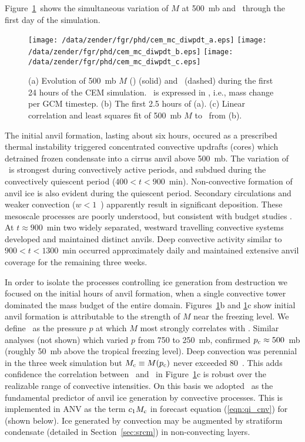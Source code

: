 \documentclass[twoside,agums]{aguplus}
\begin{document}
Figure~\ref{fig:cem_mc_diwpdt}\ shows the simultaneous variation of
$M$ at 500~mb and \IWPdot\ through the first day of the simulation.  
\begin{figure}
\begin{center}
\texttt{[image: /data/zender/fgr/phd/cem\_mc\_diwpdt\_a.eps]}\vfill
\texttt{[image: /data/zender/fgr/phd/cem\_mc\_diwpdt\_b.eps]}\vfill
\texttt{[image: /data/zender/fgr/phd/cem\_mc\_diwpdt\_c.eps]}\vfill
\end{center}
\caption[Evolution and correlation of 500~mb $M$ and \IWPdot\ during 
the first 24 hours of the CEM simulation]{
(a) Evolution of 500~mb $M$ (\gxmS) (solid) and \IWPdot\ (dashed)
during the first 24 hours of the CEM simulation. 
\IWPdot\ is expressed in \gxmSgcmt, i.e., mass change per GCM
timestep. 
(b) The first 2.5 hours of (a).
(c) Linear correlation and least squares fit of 500~mb $M$ to \IWPdot\
from (b).\label{fig:cem_mc_diwpdt}}
\end{figure}
The initial anvil formation, lasting about six hours, occured as a
prescribed thermal instability triggered concentrated convective
updrafts (cores) which detrained frozen condensate into a cirrus anvil
above 500~mb.
The variation of \IWPdot\ is strongest during convectively
active periods, and subdued during the convectively quiescent period
($400 < t < 900$~min). 
Non-convective formation of anvil ice is also evident during the
quiescent period. 
Secondary circulations and weaker convection ($w < 1$~\mxs) apparently 
result in significant deposition.
These mesoscale processes are poorly understood, but consistent with
budget studies \cite[]{LeH80}.
At $t \approx 900$~min two widely separated, westward travelling
convective systems developed and maintained distinct anvils.
Deep convective activity similar to $900 < t < 1300$~min occurred
approximately daily and maintained extensive anvil coverage for the
remaining three weeks.

In order to isolate the processes controlling ice generation
from destruction we focused on the initial hours of anvil formation,
when a single convective tower dominated the mass budget of the entire
domain. 
Figures~\ref{fig:cem_mc_diwpdt}b and \ref{fig:cem_mc_diwpdt}c show
initial anvil formation is attributable to the strength of $M$ near
the freezing level. 
We define \pc\ as the pressure $p$ at which $M$ most strongly
correlates with \IWPdot. 
Similar analyses (not shown) which varied $p$ from 750 to 250~mb,
confirmed $\mbox{$p_\mathrm{c}$} \approx 500$~mb (roughly 50~mb above the tropical
freezing level).
Deep convection was perennial in the three week simulation but 
$\mbox{$M_\mathrm{c}$} \equiv M(\mbox{$p_\mathrm{c}$})$ never exceeded 80~\gxmSs.
This adds confidence the correlation between \Mc\ and \IWPdot\ in
Figure~\ref{fig:cem_mc_diwpdt}c is robust over the realizable range of
convective intensities.
On this basis we adopted \Mc\ as the fundamental predictor of anvil
ice generation by convective processes.   
This is implemented in ANV as the term $c_1\mbox{$M_\mathrm{c}$}$ in forecast
equation (\ref{eqn:qi_cnv}) for \qi (shown below).
Ice generated by convection may be augmented by stratiform condensate
(detailed in Section~\ref{sec:srcm}) in non-convecting layers.
\end{document}
